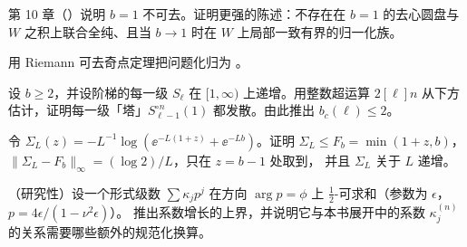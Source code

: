 \begin{exercise}\label{ch12:ex:obstruction-01}
第 10 章（\cite[命题~10.46]{KneserPaper}）说明 $b=1$ 不可去。证明更强的陈述：不存在在 $b=1$ 的去心圆盘与 $W$ 之积上联合全纯、且当 $b\to1$ 时在 $W$ 上局部一致有界的归一化族。
\end{exercise}
\begin{hint}
用 Riemann 可去奇点定理把问题化归为 \cite[命题~10.46]{KneserPaper}。
\end{hint}

\begin{exercise}\label{ch12:ex:rank-bound}
设 $b\ge2$，并设阶梯的每一级 $S_\ell$ 在 $[1,\infty)$ 上递增。用整数超运算 $2[\ell]n$ 从下方估计，证明每一级「塔」$S_{\ell-1}^{\circ n}(1)$ 都发散。由此推出 $b_c(\ell)\le2$。
\end{exercise}

\begin{exercise}\label{ch12:ex:tropical}
令 $\Sigma_L(z)=-L^{-1}\log(\ee^{-L(1+z)}+\ee^{-Lb})$。证明 $\Sigma_L\le F_b=\min(1+z,b)$，$\|\Sigma_L-F_b\|_\infty=(\log2)/L$，只在 $z=b-1$ 处取到，
并且 $\Sigma_L$ 关于 $L$ 递增。
\end{exercise}

\begin{exercise}\label{ch12:ex:gevrey}
（研究性）设一个形式级数 $\sum\kappa_jp^j$ 在方向 $\arg p=\phi$ 上 $\tfrac12$-可求和（参数为 $\epsilon$，$p=4\epsilon/(1-\nu^2\epsilon)$）。
推出系数增长的上界，并说明它与本书展开中的系数 $\kappa^{(n)}_j$ 的关系需要哪些额外的规范化换算。
\end{exercise}
